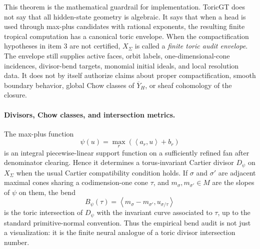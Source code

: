 \documentclass[11pt]{article}
\theoremstyle{definition}
\theoremstyle{plain}
\theoremstyle{remark}
\numberwithin{equation}{section}
\newcommand{\ip}[2]{\left\langle #1,#2\right\rangle}
\begin{document}
This theorem is the mathematical guardrail for implementation.  ToricGT does not say that all hidden-state geometry is algebraic.  It says that when a head is used through max-plus candidates with rational exponents, the resulting finite tropical computation has a canonical toric envelope.  When the compactification hypotheses in item 3 are not certified, $X_\Sigma$ is called a \emph{finite toric audit envelope}.  The envelope still supplies active faces, orbit labels, one-dimensional-cone incidences, divisor-bend targets, monomial initial ideals, and local resolution data.  It does not by itself authorize claims about proper compactification, smooth boundary behavior, global Chow classes of $\overline Y_H$, or sheaf cohomology of the closure.

\paragraph{Divisors, Chow classes, and intersection metrics.}
The max-plus function
\begin{equation}
  \psi(u)=\max_r(\ip{a_r}{u}+b_r)
\end{equation}
is an integral piecewise-linear support function on a sufficiently refined fan after denominator clearing.  Hence it determines a torus-invariant Cartier divisor $D_\psi$ on $X_\Sigma$ when the usual Cartier compatibility condition holds.  If $\sigma$ and $\sigma'$ are adjacent maximal cones sharing a codimension-one cone $\tau$, and $m_\sigma,m_{\sigma'}\in M$ are the slopes of $\psi$ on them, the bend
\begin{equation}
  B_\psi(\tau)=\ip{m_\sigma-m_{\sigma'}}{u_{\sigma/\tau}}
\end{equation}
is the toric intersection of $D_\psi$ with the invariant curve associated to $\tau$, up to the standard primitive-normal convention.  Thus the empirical bend audit is not just a visualization: it is the finite neural analogue of a toric divisor intersection number.
\end{document}
